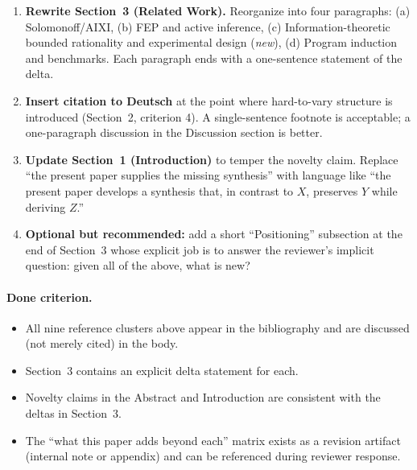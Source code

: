 \documentclass[11pt]{article}
\begin{document}
\begin{enumerate}[leftmargin=*]
\begin{itemize}[leftmargin=*]
\item Schmidhuber: compression-as-curiosity, but the formalism is asymptotic and behavioral; this paper gives a variational functional whose minimizer coincides exactly with the Bayes posterior under the universal prior.
\item And so on for each.
\end{itemize}
\item \textbf{Rewrite Section~3 (Related Work).} Reorganize into four paragraphs: (a) Solomonoff/AIXI, (b) FEP and active inference, (c) Information-theoretic bounded rationality and experimental design (\emph{new}), (d) Program induction and benchmarks. Each paragraph ends with a one-sentence statement of the delta.
\item \textbf{Insert citation to Deutsch} at the point where hard-to-vary structure is introduced (Section~2, criterion 4). A single-sentence footnote is acceptable; a one-paragraph discussion in the Discussion section is better.
\item \textbf{Update Section~1 (Introduction)} to temper the novelty claim. Replace ``the present paper supplies the missing synthesis'' with language like ``the present paper develops a synthesis that, in contrast to $X$, preserves $Y$ while deriving $Z$.''
\item \textbf{Optional but recommended:} add a short ``Positioning'' subsection at the end of Section~3 whose explicit job is to answer the reviewer's implicit question: given all of the above, what is new?
\end{enumerate}

\paragraph{Done criterion.}
\begin{itemize}[leftmargin=*]
\item All nine reference clusters above appear in the bibliography and are discussed (not merely cited) in the body.
\item Section~3 contains an explicit delta statement for each.
\item Novelty claims in the Abstract and Introduction are consistent with the deltas in Section~3.
\item The ``what this paper adds beyond each'' matrix exists as a revision artifact (internal note or appendix) and can be referenced during reviewer response.
\end{itemize}
\end{document}
